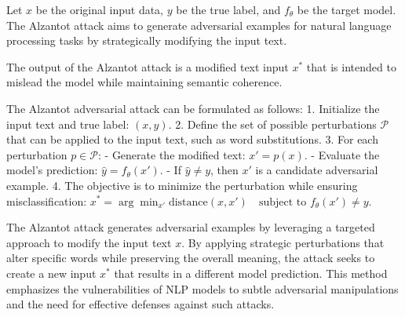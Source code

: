 Let \( x \) be the original input data, \( y \) be the true label, and \( f_{\theta} \) be the target model. The Alzantot attack aims to generate adversarial examples for natural language processing tasks by strategically modifying the input text.

The output of the Alzantot attack is a modified text input \( x^* \) that is intended to mislead the model while maintaining semantic coherence.

The Alzantot adversarial attack can be formulated as follows:
1. Initialize the input text and true label:
   $
   (x, y).
   $
2. Define the set of possible perturbations \( \mathcal{P} \) that can be applied to the input text, such as word substitutions.
3. For each perturbation \( p \in \mathcal{P} \):
   - Generate the modified text:
   $
   x' = p(x).
   $
   - Evaluate the model's prediction:
   $
   \hat{y} = f_{\theta}(x').
   $
   - If \( \hat{y} \neq y \), then \( x' \) is a candidate adversarial example.
4. The objective is to minimize the perturbation while ensuring misclassification:
   $
   x^* = \arg\min_{x'} \text{distance}(x, x') \quad \text{subject to } f_{\theta}(x') \neq y.
   $

The Alzantot attack generates adversarial examples by leveraging a targeted approach to modify the input text \( x \). By applying strategic perturbations that alter specific words while preserving the overall meaning, the attack seeks to create a new input \( x^* \) that results in a different model prediction. This method emphasizes the vulnerabilities of NLP models to subtle adversarial manipulations and the need for effective defenses against such attacks.

